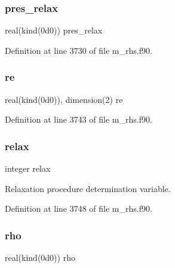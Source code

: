 \mbox{\label{m__rhs_8f90_a9dff053a7e3f9c1702a161f55d3e1726}} 
\subsubsection{\texorpdfstring{pres\+\_\+relax}{pres\_relax}}
{\footnotesize\ttfamily real(kind(0d0)) pres\+\_\+relax}



Definition at line 3730 of file m\+\_\+rhs.\+f90.

\mbox{\label{m__rhs_8f90_a6c337b82dc4c47f2d3cc57408aa1fc9f}} 
\subsubsection{\texorpdfstring{re}{re}}
{\footnotesize\ttfamily real(kind(0d0)), dimension(2) re}



Definition at line 3743 of file m\+\_\+rhs.\+f90.

\mbox{\label{m__rhs_8f90_a0048c79fcd5325fffae011dc032b86fb}} 
\subsubsection{\texorpdfstring{relax}{relax}}
{\footnotesize\ttfamily integer relax}



Relaxation procedure determination variable. 



Definition at line 3748 of file m\+\_\+rhs.\+f90.

\mbox{\label{m__rhs_8f90_a340bafa0c8d745c3060facd9cfef7ec4}} 
\subsubsection{\texorpdfstring{rho}{rho}}
{\footnotesize\ttfamily real(kind(0d0)) rho}




